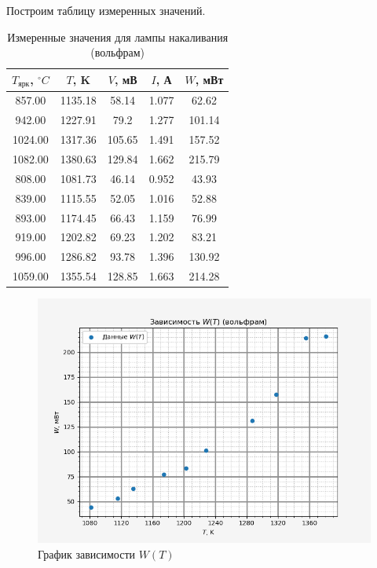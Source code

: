     Построим таблицу измеренных значений.

    \begin{table}[h!]
        \centering
        \begin{tabular}{|c|c|c|c|c|}
        \hline
        $T_{\text{ярк}}$, $^\circ C$ & $T$, K  & $V$, мВ & $I$, А & $W$, мВт \\ \hline
        857.00              & 1135.18 & 58.14   & 1.077  & 62.62  \\ \hline
        942.00              & 1227.91 & 79.2    & 1.277  & 101.14 \\ \hline
        1024.00             & 1317.36 & 105.65  & 1.491  & 157.52 \\ \hline
        1082.00             & 1380.63 & 129.84  & 1.662  & 215.79 \\ \hline
        808.00              & 1081.73 & 46.14   & 0.952  & 43.93  \\ \hline
        839.00              & 1115.55 & 52.05   & 1.016  & 52.88  \\ \hline
        893.00              & 1174.45 & 66.43   & 1.159  & 76.99  \\ \hline
        919.00              & 1202.82 & 69.23   & 1.202  & 83.21  \\ \hline
        996.00              & 1286.82 & 93.78   & 1.396  & 130.92 \\ \hline
        1059.00             & 1355.54 & 128.85  & 1.663  & 214.28 \\ \hline
        \end{tabular}
        \caption{Измеренные значения для лампы накаливания (вольфрам)}
    \end{table}
    
    \begin{figure}[h!]
        \centering
        \includegraphics[width = 13 cm]{images/WT}
        \caption{График зависимости $W(T)$}
        \label{}
    \end{figure}

